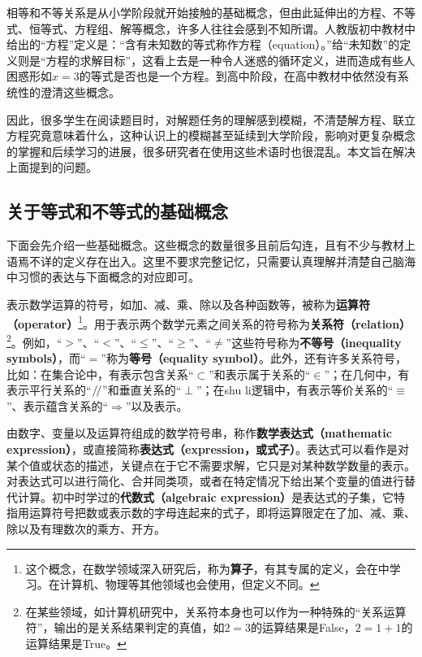
\begin{issues}
\issueDraft
\end{issues}


相等和不等关系是从小学阶段就开始接触的基础概念，但由此延伸出的方程、不等式、恒等式、方程组、解等概念，许多人往往会感到不知所谓。人教版初中教材中给出的“方程”定义是：“含有未知数的等式称作方程（equation）。”给“未知数”的定义则是“方程的求解目标”，这看上去是一种令人迷惑的循环定义，进而造成有些人困惑形如$x=3$的等式是否也是一个方程。到高中阶段，在高中教材中依然没有系统性的澄清这些概念。

因此，很多学生在阅读题目时，对解题任务的理解感到模糊，不清楚解方程、联立方程究竟意味着什么，这种认识上的模糊甚至延续到大学阶段，影响对更复杂概念的掌握和后续学习的进展，很多研究者在使用这些术语时也很混乱。本文旨在解决上面提到的问题。

\subsection{关于等式和不等式的基础概念}

下面会先介绍一些基础概念。这些概念的数量很多且前后勾连，且有不少与教材上语焉不详的定义存在出入。这里不要求完整记忆，只需要认真理解并清楚自己脑海中习惯的表达与下面概念的对应即可。

表示数学运算的符号，如加、减、乘、除以及各种函数等，被称为\textbf{运算符（operator）}\footnote{这个概念，在数学领域深入研究后，称为\textbf{算子}，有其专属的定义，会在中学习。在计算机、物理等其他领域也会使用，但定义不同。}。用于表示两个数学元素之间关系的符号称为\textbf{关系符（relation）}\footnote{在某些领域，如计算机研究中，关系符本身也可以作为一种特殊的“关系运算符”，输出的是关系结果判定的真值，如$2=3$的运算结果是False，$2=1+1$的运算结果是True。}。例如，“$>$”、“$<$”、“$\leq$”、“$\geq$”、“$\neq$”这些符号称为\textbf{不等号（inequality symbols）}，而“$=$”称为\textbf{等号（equality symbol）}。此外，还有许多关系符号，比如：在集合论中，有表示包含关系“$\subset$”和表示属于关系的“$\in$”；在几何中，有表示平行关系的“$\mathrel{/\mskip-2.5mu/}$”和垂直关系的“$\perp$”；在shu li逻辑中，有表示等价关系的“$\equiv$”、表示蕴含关系的“$\Rightarrow$”以及表示。

由数字、变量以及运算符组成的数学符号串，称作\textbf{数学表达式（mathematic expression）}，或直接简称\textbf{表达式（expression，或式子）}。表达式可以看作是对某个值或状态的描述，关键点在于它不需要求解，它只是对某种数学数量的表示。对表达式可以进行简化、合并同类项，或者在特定情况下给出某个变量的值进行替代计算。初中时学过的\textbf{代数式（algebraic expression）}是表达式的子集，它特指用运算符号把数或表示数的字母连起来的式子，即将运算限定在了加、减、乘、除以及有理数次的乘方、开方。

